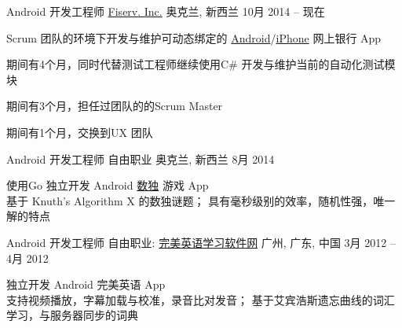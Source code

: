 
\begin{cventries}
	\cventry
	{Android 开发工程师}
	{\href{https://www.fiserv.com/about.aspx}{Fiserv. Inc.}}
	{奥克兰, \enskip 新西兰}
	{10月 2014 – 现在}
	{
		\begin{cvitems}
			\item {Scrum 团队的环境下开发与维护可动态绑定的 \href{https://play.google.com/store/apps/details?id=com.fiserv.touchbankingasp&hl=en}{Android}/\href{https://itunes.apple.com/us/app/touchbanking/id386678211?mt=8}{iPhone} 网上银行 App}
			\item {期间有4个月，同时代替测试工程师继续使用C\# 开发与维护当前的自动化测试模块}
			\item {期间有3个月，担任过团队的的Scrum Master}
			\item {期间有1个月，交换到UX 团队}
		\end{cvitems}
	}
\end{cventries}

\begin{cventries}
	\cventry
	{Android 开发工程师}
	{自由职业}
	{奥克兰, \enskip 新西兰}
	{8月 2014}
	{
		\begin{cvitems}
			\item {使用Go 独立开发 Android \href{https://play.google.com/store/apps/details?id=com.gmail.jiangyang5157.sudoku}{数独} 游戏 App\\
			基于 Knuth’s Algorithm X 的数独谜题；
			具有毫秒级别的效率，随机性强，唯一解的特点}
		\end{cvitems}
	}
\end{cventries}

\begin{cventries}
	\cventry
	{Android 开发工程师}
	{自由职业: \href{http://www.english119.cn}{完美英语学习软件网}}
	{广州, \enskip 广东, \enskip 中国}
	{3月 2012 – 4月 2012}
	{
		\begin{cvitems}
			\item {独立开发 Android 完美英语 App\\
				支持视频播放，字幕加载与校准，录音比对发音；
				基于艾宾浩斯遗忘曲线的词汇学习，与服务器同步的词典}
		\end{cvitems}
	}
\end{cventries}

